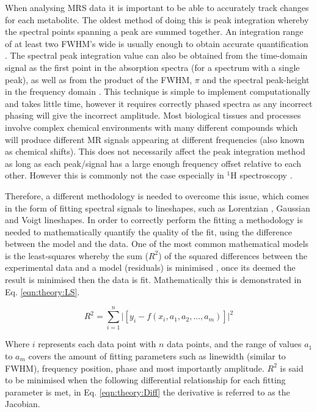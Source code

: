When analysing \ac{MRS} data it is important to be able to accurately track changes for each metabolite. The oldest method of doing this is peak integration whereby the spectral points spanning a peak are summed together. An integration range of at least two \ac{FWHM}'s wide is usually enough to obtain accurate quantification \cite{Near2021PreprocessingRecommendations}. The spectral peak integration value can also be obtained from the time-domain signal as the first point in the absorption spectra (for a spectrum with a single peak), as well as from the product of the \ac{FWHM}, $\pi$ and the spectral peak-height in the frequency domain \cite{deGraaf2019InSpectroscopy}. This technique is simple to implement computationally and takes little time, however it requires correctly phased spectra as any incorrect phasing will give the incorrect amplitude. Most biological tissues and processes involve complex chemical environments with many different compounds which will produce different MR signals appearing at different frequencies (also known as chemical shifts). This does not necessarily affect the peak integration method as long as each peak/signal has a large enough frequency offset relative to each other. However this is commonly not the case especially in $^1$H spectroscopy \cite{Alger2010QuantitativeReview}. 

Therefore, a different methodology is needed to overcome this issue, which comes in the form of fitting spectral signals to lineshapes, such as Lorentzian \cite{Lorentz1895TheHeat}, Gaussian and Voigt \cite{Near2021PreprocessingRecommendations} lineshapes. In order to correctly perform the fitting a methodology is needed to mathematically quantify the quality of the fit, using the difference between the model and the data. One of the most common mathematical models is the least-squares \cite{Golub1973TheSeparate} whereby the sum ($R^2$) of the squared differences between the experimental data and a model (residuals) is minimised \cite{Vanhamme2001MRMethods}, once its deemed the result is minimised then the data is fit. Mathematically this is demonstrated in Eq. \ref{eqn:theory:LS}.

\begin{equation}
    R^2 = \sum_{i=1}^{n} \big| [y_i - f(x_i,a_1,a_2,...,a_m)] \big|^2
    \label{eqn:theory:LS}
\end{equation}

\noindent Where $i$ represents each data point with $n$ data points, and the range of values $a_1$ to $a_m$ covers the amount of fitting parameters such as linewidth (similar to \ac{FWHM}), frequency position, phase and most importantly amplitude. $R^2$ is said to be minimised when the following differential relationship for each fitting parameter is met, in Eq. \ref{eqn:theory:Diff} the derivative is referred to as the Jacobian.

